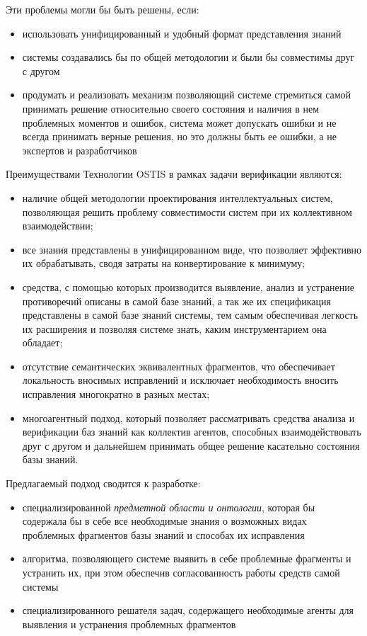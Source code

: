 Эти проблемы могли бы быть решены, если:
\begin{itemize}
    \item использовать унифицированный и удобный формат представления знаний
    \item системы создавались бы по общей методологии и были бы совместимы друг с другом
    \item продумать и реализовать механизм позволяющий системе стремиться самой принимать решение относительно своего состояния и наличия в нем проблемных моментов и ошибок, система может допускать ошибки и не всегда принимать верные решения, но это должны быть ее ошибки, а не экспертов и разработчиков
\end{itemize}

Преимуществами Технологии OSTIS в рамках задачи верификации являются:
\begin{itemize}
    \item наличие общей методологии проектирования интеллектуальных систем, позволяющая решить проблему совместимости систем при их коллективном взаимодействии;
    \item все знания представлены в унифицированном виде, что позволяет эффективно их обрабатывать, сводя затраты на конвертирование к минимуму;
   \item средства, с помощью которых производится выявление, анализ и устранение противоречий описаны в самой базе знаний, а так же их спецификация представлены в самой базе знаний системы, тем самым обеспечивая легкость их расширения и позволяя системе знать, каким инструментарием она обладает;
   \item отсутствие семантических эквивалентных фрагментов, что обеспечивает локальность вносимых исправлений и исключает необходимость вносить исправления многократно в разных местах;
   \item многоагентный подход, который позволяет рассматривать средства анализа и верификации баз знаний как коллектив агентов, способных взаимодействовать друг с другом и дальнейшем принимать общее решение касательно состояния базы знаний. 
\end{itemize}

Предлагаемый подход сводится к разработке:
\begin{itemize}
    \item специализированной \textit{предметной области и онтологии}, которая бы содержала бы в себе все необходимые знания о возможных видах проблемных фрагментов базы знаний и способах их исправления
    \item алгоритма, позволяющего системе выявить в себе проблемные фрагменты и устранить их, при этом обеспечив согласованность работы средств самой системы
    \item специализированного решателя задач, содержащего необходимые агенты для выявления и устранения проблемных фрагментов
\end{itemize}

